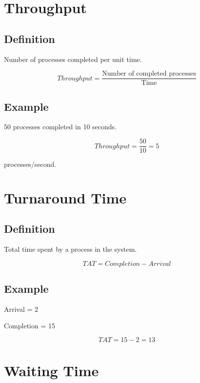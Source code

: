 \section{Throughput}

\subsection{Definition}

Number of processes completed per unit time.

\[
Throughput =
\frac{\text{Number of completed processes}}
{\text{Time}}
\]

\subsection{Example}

50 processes completed in 10 seconds.

\[
Throughput = \frac{50}{10}=5
\]

processes/second.

\section{Turnaround Time}

\subsection{Definition}

Total time spent by a process in the system.

\[
TAT = Completion - Arrival
\]

\subsection{Example}

Arrival = 2

Completion = 15

\[
TAT=15-2=13
\]

\section{Waiting Time}

